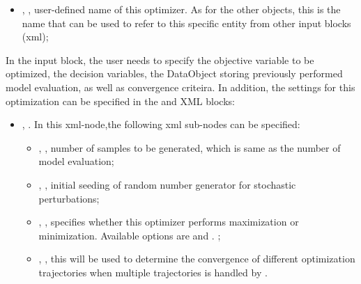 %

%
\attrsIntro
\vspace{-5mm}
\begin{itemize}
\itemsep0em
\item {}, , user-defined name of this optimizer. \nb As for the other objects, this is 
the name that can be used to refer to this specific entity from other input blocks (xml);
\end{itemize}
\vspace{-5mm}

In the  input block, the user needs to specify the objective variable to be optimized, the decision variables, the 
DataObject storing previously performed model evaluation, as well as convergence criteira. In addition, the settings for this 
optimization can be specified in the  and  XML blocks:
\begin{itemize}
\item {},  . In this xml-node,the following xml sub-nodes can be 
specified:
  \begin{itemize}
    \item {}, , number of samples to be generated, which is same as the number of 
    model evaluation;
    \item {}, , initial seeding of random number generator for stochastic 
    perturbations;
    \item {},  , specifies whether this optimizer performs maximization 
    or minimization. Available options are  and .
    ;
    \item {}, , this will be used to determine the convergence of different 
    optimization trajectories when multiple trajectories is handled by .
  \end{itemize}
\end{itemize}
